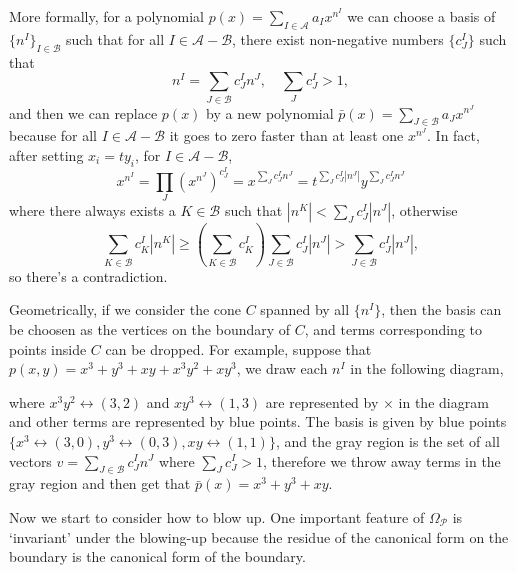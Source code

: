 \documentclass[12pt]{article}
\theoremstyle{definition}
\theoremstyle{plain}
\begin{document}
More formally, for a polynomial $p(x)=\sum_{I\in \mathscr A}a_I x^{n^I}$ we can choose a basis of $\{n^I\}_{I\in \mathscr B}$ such that for all $I \in \mathscr A-\mathscr B$, there exist non-negative numbers $\{c^I_J\}$ such that
\[
	n^I = \sum_{J\in \mathscr B}c^I_J n^J,\quad \sum_J c^I_J>  1,
\]
and then we can replace $p(x)$ by a new polynomial $\bar p(x)=\sum_{J\in \mathscr B}a_J x^{n^J}$ because for all $I \in \mathscr A-\mathscr B$ it goes to zero faster than at least one $x^{n^J}$. In fact, after setting $x_i=t y_i$, for $I \in \mathscr A-\mathscr B$, 
\[
	x^{n^I}=\prod_J (x^{n^J})^{c^I_J}=x^{\sum_J c^I_J n^J} = t^{\sum_J c^I_J |n^J|}y^{\sum_J c^I_J n^J}
\]
where there always exists a $K\in \mathscr B$ such that $|n^K|<\sum_J c^I_J |n^J|$, otherwise
\[
	\sum_{K\in \mathscr B} c^I_K|n^K|\geq \left(\sum_{K\in \mathscr B} c^I_K\right)\sum_{J\in \mathscr B} c^I_J |n^J|>\sum_{J\in \mathscr B} c^I_J |n^J|,
\]
so there's a contradiction.

Geometrically, if we consider the cone $C$ spanned by all $\{n^I\}$, then the basis can be choosen as the vertices on the boundary of $C$, and terms corresponding to points inside $C$ can be dropped.
For example, suppose that $p(x,y)=x^3+y^3+xy+x^3y^2+xy^3$, we draw each $n^I$ in the following diagram,
\begin{center}
\end{center}
where $x^3y^2\leftrightarrow (3,2)$ and $xy^3\leftrightarrow (1,3)$ are represented by $\times$ in the diagram and other terms are represented by blue points. The basis is given by blue points $\{x^3\leftrightarrow (3,0),y^3\leftrightarrow (0,3),xy\leftrightarrow (1,1)\}$, and the gray region is the set of all vectors $v=\sum_{J\in \mathscr B}c^I_J n^J$ where $\sum_J c^I_J>1$, therefore we throw away terms in the gray region and then get that $\bar p(x)=x^3+y^3+xy$. 

Now we start to consider how to blow up. One important feature of $\Omega_{\mathcal P}$ is `invariant' under the blowing-up because the residue of the canonical form on the boundary is the canonical form of the boundary.
\end{document}
